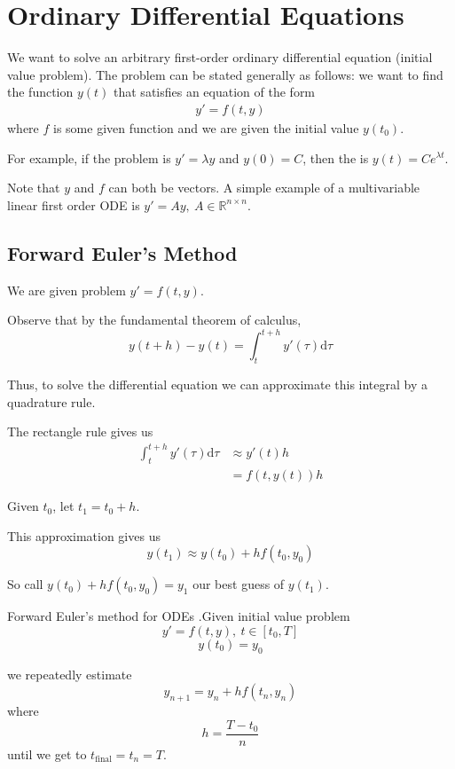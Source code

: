 \documentclass[12pt,letterpaper]{article}
\newcommand{\R}{\mathbb{R}}
\newcommand{\dd}{\mathrm{d}}
\begin{document}
\section{Ordinary Differential Equations}
We want to solve an arbitrary first-order ordinary differential equation (initial value problem). The problem can be stated generally as follows: we want to find the function $y(t)$ that satisfies an equation of the form
\begin{align}
	y' = f(t, y)
\end{align}
where $f$ is some given function and we are given the initial value $y(t_0)$.

For example, if the problem is $y' = \lambda y$ and $y(0) = C$, then the is $y(t) = Ce^{\lambda t}$.

Note that $y$ and $f$ can both be vectors. A simple example of a multivariable linear first order ODE is $y' = Ay,\ A \in \R^{n \times n}$.

\subsection{Forward Euler's Method}
We are given problem $y' = f(t, y)$.

Observe that by the fundamental theorem of calculus,
\begin{equation}
	y(t+h) - y(t) = \int_t^{t+h} y'(\tau) \dd \tau
\end{equation}

Thus, to solve the differential equation we can approximate this integral by a quadrature rule.

The rectangle rule gives us
\begin{align}
	\int_t^{t+h} y'(\tau) \dd \tau &\approx y'(t) h \\
	&= f(t, y(t)) h
\end{align}

Given $t_0$, let $t_1 = t_0 + h$.

This approximation gives us
\begin{equation}
	y(t_1) \approx y(t_0) + hf(t_0, y_0)
\end{equation}

So call $y(t_0) + hf(t_0, y_0) = y_1$ our best guess of $y(t_1)$.

\begin{algo}{Forward Euler's method for ODEs}
.Given initial value problem
\begin{equation}
	y' = f(t, y),\ t \in [t_0, T]
\end{equation}
\begin{equation}
	y(t_0) = y_0
\end{equation}

we repeatedly estimate
\begin{equation}
	y_{n+1} = y_n + h f(t_n, y_n)
\end{equation}
where
\begin{equation}
	h = \frac{T - t_0}{n}
\end{equation}
until we get to $t_\text{final} = t_n = T$.
\end{algo}
\end{document}

